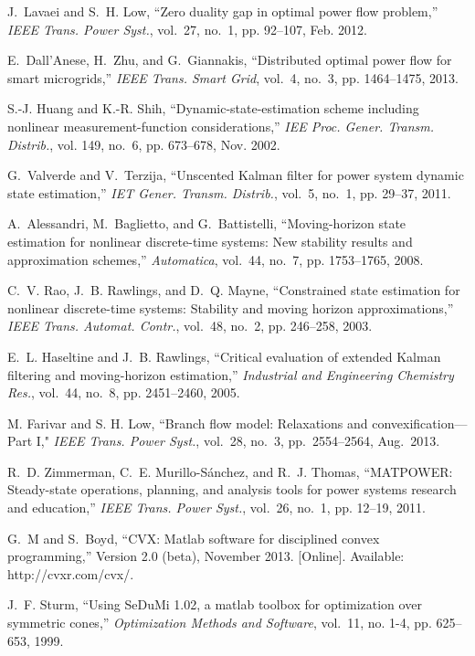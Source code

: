 \documentclass[conference]{IEEEtran}
\begin{document}
\begin{thebibliography}{10}
J.~Lavaei and S.~H. Low, ``Zero duality gap in optimal power flow problem,''
  \emph{IEEE Trans. Power Syst.}, vol.~27, no.~1, pp. 92--107, Feb. 2012.

E.~Dall'Anese, H.~Zhu, and G.~Giannakis, ``Distributed optimal power flow for
  smart microgrids,'' \emph{IEEE Trans. Smart Grid}, vol.~4, no.~3,
  pp. 1464--1475, 2013.

S.-J. Huang and K.-R. Shih, ``Dynamic-state-estimation scheme including
  nonlinear measurement-function considerations,'' \emph{IEE Proc. Gener.
  Transm. Distrib.}, vol. 149, no.~6, pp. 673--678, Nov. 2002.

G.~Valverde and V.~Terzija, ``Unscented Kalman filter for power system dynamic
  state estimation,'' \emph{IET Gener. Transm. Distrib.}, vol.~5, no.~1, pp.
  29--37, 2011.

A.~Alessandri, M.~Baglietto, and G.~Battistelli, ``Moving-horizon state
  estimation for nonlinear discrete-time systems: New stability results and
  approximation schemes,'' \emph{Automatica}, vol.~44, no.~7, pp. 1753--1765,
  2008.

C.~V. Rao, J.~B. Rawlings, and D.~Q. Mayne, ``Constrained state estimation for
  nonlinear discrete-time systems: Stability and moving horizon
  approximations,'' \emph{IEEE Trans. Automat. Contr.}, vol.~48, no.~2, pp.
  246--258, 2003.

E.~L. Haseltine and J.~B. Rawlings, ``Critical evaluation of extended Kalman
  filtering and moving-horizon estimation,'' \emph{Industrial and Engineering
  Chemistry Res.}, vol.~44, no.~8, pp. 2451--2460, 2005.

M. Farivar and S. H. Low, ``Branch flow model: Relaxations and convexification---Part I," \emph{IEEE Trans. Power Syst.}, vol.~28, no.~3, pp.~2554--2564, Aug.~2013.

R.~D. Zimmerman, C.~E. Murillo-S{\'a}nchez, and R.~J. Thomas, ``MATPOWER:
  Steady-state operations, planning, and analysis tools for power systems
  research and education,'' \emph{IEEE Trans. Power Syst.}, vol.~26, no.~1, pp.
  12--19, 2011.

G.~M and S.~Boyd, ``CVX: Matlab software for disciplined convex programming,''
  Version 2.0 (beta), November 2013. [Online]. Available: http://cvxr.com/cvx/.

J.~F. Sturm, ``Using SeDuMi 1.02, a matlab toolbox for optimization over
  symmetric cones,'' \emph{Optimization Methods and Software}, vol.~11, no.
  1-4, pp. 625--653, 1999.

\end{thebibliography}
\end{document}
